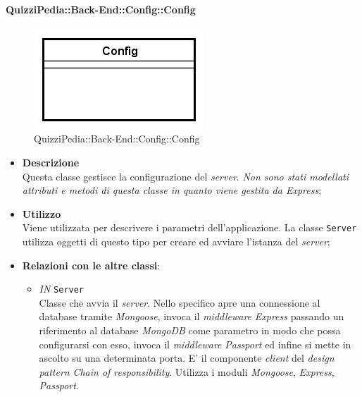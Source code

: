 \paragraph{QuizziPedia::Back-End::Config::Config}
\label{QuizziPedia::Back-End::Config::Config}
\begin{figure}[ht]
	\centering
	\includegraphics[scale=0.45]{UML/Classi/Back-End/QuizziPedia_Back-End_Config_Config.png}
	\caption{QuizziPedia::Back-End::Config::Config}
	\end{figure}
\FloatBarrier
	\begin{itemize}
		\item \textbf{Descrizione} \\
		Questa classe gestisce la configurazione del \textit{server}. \textit{Non sono stati modellati attributi e metodi di questa classe in quanto viene gestita da Express};
		\item \textbf{Utilizzo} \\
		Viene utilizzata per descrivere i parametri dell'applicazione. La classe \texttt{Server} utilizza oggetti di questo tipo per creare ed avviare l'istanza del \textit{server};
		\item \textbf{Relazioni con le altre classi}:
		 \begin{itemize}
		 	\item \textit{IN} \texttt{Server} \\
		 	Classe che avvia il \textit{server}. Nello specifico apre una connessione al database tramite \textit{Mongoose}, invoca il \textit{middleware} \textit{Express} passando un riferimento al database \textit{MongoDB} come parametro in modo  che possa configurarsi con esso, invoca il \textit{middleware} \textit{Passport} ed infine si mette in ascolto su una determinata porta. E' il componente \textit{client} del \textit{design pattern} \textit{Chain of responsibility}. Utilizza i moduli \textit{Mongoose}, \textit{Express}, \textit{Passport}.
		 \end{itemize}
	\end{itemize}
